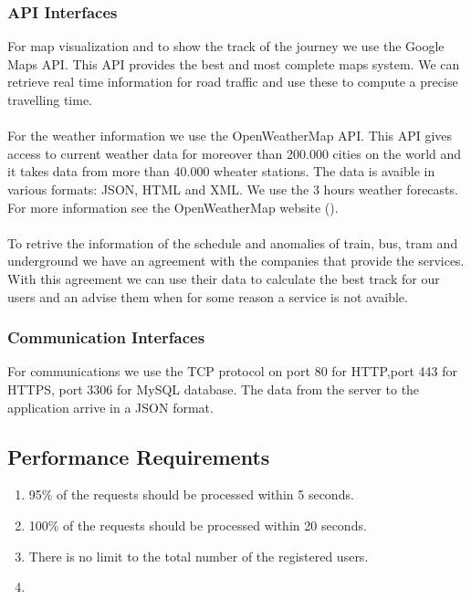 \subsubsection{API Interfaces}
For map visualization and to show the track of the journey we use the Google Maps API. This API provides the best and most complete maps system. We can retrieve real time information for road traffic and use these to compute a precise travelling time.\\\\
For the weather information we use the OpenWeatherMap API. This API gives access to current weather data for moreover than 200.000 cities on the world and it takes data from more than 40.000 wheater stations. The data is avaible in various formats: JSON, HTML and XML. We use the 3 hours weather forecasts. For more information see the OpenWeatherMap website ({\href{http://openweathermap.org/api}{\color{Black}{http://openweathermap.org/api}}}).
\\\\
To retrive the information of the schedule and anomalies of train, bus, tram and underground we have an agreement with the companies that provide the services. With this agreement we can use their data to calculate the best track for our users and an advise them when for some reason a service is not avaible.

\subsubsection{Communication Interfaces}
For communications we use the TCP protocol on port 80 for HTTP,port 443 for HTTPS, port 3306 for MySQL database. The data from the server to the application arrive in a JSON format.



\subsection{Performance Requirements}
\begin{enumerate}
\item
95\% of the requests should be processed within 5 seconds.
\item
100\% of the requests should be processed within 20 seconds.
\item
There is no limit to the total number of the registered users.
\item

\end{enumerate}

